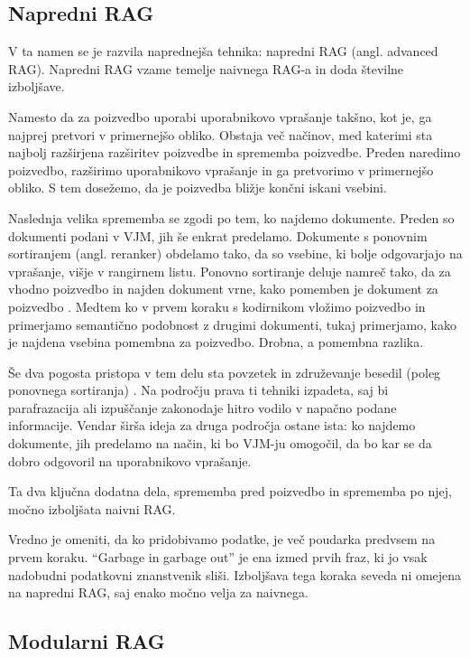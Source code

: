 \documentclass[a4paper,12pt,openright]{book}
\begin{document}
\subsection{Napredni RAG}

V ta namen se je razvila naprednejša tehnika: napredni RAG \cite{rag_survey} (angl. advanced RAG). Napredni RAG vzame temelje naivnega RAG-a in doda številne izboljšave.

Namesto da za poizvedbo uporabi uporabnikovo vprašanje takšno, kot je, ga najprej pretvori v primernejšo obliko. Obstaja več načinov, med katerimi sta najbolj razširjena razširitev poizvedbe in sprememba poizvedbe. Preden naredimo poizvedbo, razširimo uporabnikovo vprašanje in ga pretvorimo v primernejšo obliko. S tem dosežemo, da je poizvedba bližje končni iskani vsebini.

Naslednja velika sprememba se zgodi po tem, ko najdemo dokumente. Preden so dokumenti podani v VJM, jih še enkrat predelamo. Dokumente s ponovnim sortiranjem (angl. reranker) obdelamo tako, da so vsebine, ki bolje odgovarjajo na vprašanje, višje v rangirnem listu. Ponovno sortiranje deluje namreč tako, da za vhodno poizvedbo in najden dokument vrne, kako pomemben je dokument za poizvedbo \cite{query_rewriting}. Medtem ko v prvem koraku s kodirnikom vložimo poizvedbo in primerjamo semantično podobnost z drugimi dokumenti, tukaj primerjamo, kako je najdena vsebina pomembna za poizvedbo. Drobna, a pomembna razlika.

Še dva pogosta pristopa v tem delu sta povzetek in združevanje besedil (poleg ponovnega sortiranja) \cite{other_query_transformations}. Na področju prava ti tehniki izpadeta, saj bi parafrazacija ali izpuščanje zakonodaje hitro vodilo v napačno podane informacije. Vendar širša ideja za druga področja ostane ista: ko najdemo dokumente, jih predelamo na način, ki bo VJM-ju omogočil, da bo kar se da dobro odgovoril na uporabnikovo vprašanje.

Ta dva ključna dodatna dela, sprememba pred poizvedbo in sprememba po njej, močno izboljšata naivni RAG.

Vredno je omeniti, da ko pridobivamo podatke, je več poudarka predvsem na prvem koraku. “Garbage in garbage out” je ena izmed prvih fraz, ki jo vsak nadobudni podatkovni znanstvenik sliši. Izboljšava tega koraka seveda ni omejena na napredni RAG, saj enako močno velja za naivnega.

\subsection{Modularni RAG}
\end{document}
